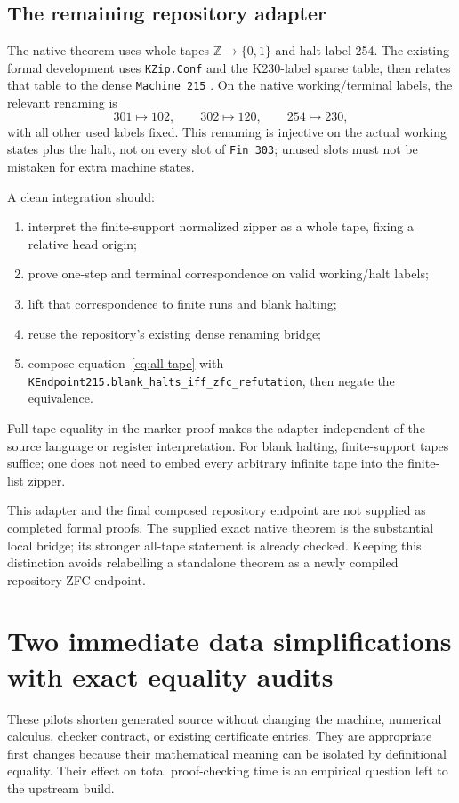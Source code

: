 \documentclass[11pt]{article}
\begin{document}
\subsection{The remaining repository adapter}

The native theorem uses whole tapes $\mathbb Z\to\{0,1\}$ and halt label 254. The existing formal development uses \texttt{KZip.Conf} and the K230-label sparse table, then relates that table to the dense \texttt{Machine 215} \cite{zip,table,bridge,endpoint}. On the native working/terminal labels, the relevant renaming is
\[
301\mapsto102,\qquad302\mapsto120,\qquad254\mapsto230,
\]
with all other used labels fixed. This renaming is injective on the actual working states plus the halt, not on every slot of \texttt{Fin 303}; unused slots must not be mistaken for extra machine states.

A clean integration should:
\begin{enumerate}
\item interpret the finite-support normalized zipper as a whole tape, fixing a relative head origin;
\item prove one-step and terminal correspondence on valid working/halt labels;
\item lift that correspondence to finite runs and blank halting;
\item reuse the repository's existing dense renaming bridge;
\item compose equation~\eqref{eq:all-tape} with \texttt{KEndpoint215.blank\_halts\_iff\_zfc\_refutation}, then negate the equivalence.
\end{enumerate}
Full tape equality in the marker proof makes the adapter independent of the source language or register interpretation. For blank halting, finite-support tapes suffice; one does not need to embed every arbitrary infinite tape into the finite-list zipper.

This adapter and the final composed repository endpoint are not supplied as completed formal proofs. The supplied exact native theorem is the substantial local bridge; its stronger all-tape statement is already checked. Keeping this distinction avoids relabelling a standalone theorem as a newly compiled repository ZFC endpoint.

\section{Two immediate data simplifications with exact equality audits}

These pilots shorten generated source without changing the machine, numerical calculus, checker contract, or existing certificate entries. They are appropriate first changes because their mathematical meaning can be isolated by definitional equality. Their effect on total proof-checking time is an empirical question left to the upstream build.
\end{document}
